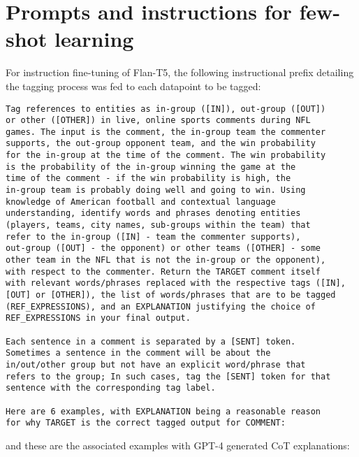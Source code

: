 \chapter{Prompts and instructions for few-shot learning}
\label{appendix:prompts}

For instruction fine-tuning of Flan-T5, the following instructional prefix detailing the tagging process was fed to each datapoint to be tagged:

\begin{verbatim}
Tag references to entities as in-group ([IN]), out-group ([OUT]) 
or other ([OTHER]) in live, online sports comments during NFL 
games. The input is the comment, the in-group team the commenter 
supports, the out-group opponent team, and the win probability 
for the in-group at the time of the comment. The win probability 
is the probability of the in-group winning the game at the 
time of the comment - if the win probability is high, the 
in-group team is probably doing well and going to win. Using 
knowledge of American football and contextual language 
understanding, identify words and phrases denoting entities 
(players, teams, city names, sub-groups within the team) that 
refer to the in-group ([IN] - team the commenter supports), 
out-group ([OUT] - the opponent) or other teams ([OTHER] - some 
other team in the NFL that is not the in-group or the opponent), 
with respect to the commenter. Return the TARGET comment itself 
with relevant words/phrases replaced with the respective tags ([IN], 
[OUT] or [OTHER]), the list of words/phrases that are to be tagged 
(REF_EXPRESSIONS), and an EXPLANATION justifying the choice of 
REF_EXPRESSIONS in your final output.

Each sentence in a comment is separated by a [SENT] token. 
Sometimes a sentence in the comment will be about the 
in/out/other group but not have an explicit word/phrase that 
refers to the group; In such cases, tag the [SENT] token for that 
sentence with the corresponding tag label.

Here are 6 examples, with EXPLANATION being a reasonable reason 
for why TARGET is the correct tagged output for COMMENT:
\end{verbatim}

and these are the associated examples with GPT-4 generated CoT explanations:

